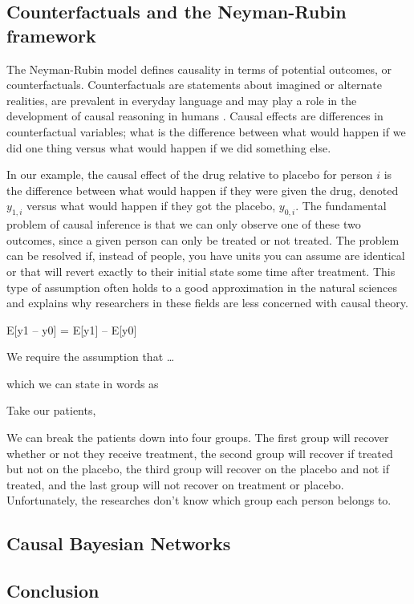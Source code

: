 \documentclass[11pt,a4paper]{article}
\begin{document}
\subsection{Counterfactuals and the Neyman-Rubin framework}

The Neyman-Rubin model \cite{Rubin1974,Rubin1978,Rosenbaum1983, Rubin2005,Rubin2008} defines causality in terms of potential outcomes, or counterfactuals. Counterfactuals are statements about imagined or alternate realities, are prevalent in everyday language and may play a role in the development of causal reasoning in humans \cite{Weisberg2013}. Causal effects are differences in counterfactual variables; what is the difference between what would happen if we did one thing versus what would happen if we did something else. 

In our example, the causal effect of the drug relative to placebo for person $i$ is the difference between what would happen if they were given the drug, denoted $y_{1,i}$ versus what would happen if they got the placebo, $y_{0,i}$. The fundamental problem of causal inference is that we can only observe one of these two outcomes, since a given person can only be treated or not treated. The problem can be resolved if, instead of people, you have units you can assume are identical or that will revert exactly to their initial state some time after treatment. This type of assumption often holds to a good approximation in the natural sciences and explains why researchers in these fields are less concerned with causal theory.  

E[y1 – y0] = E[y1] – E[y0]

We require the assumption that …

which we can state in words as


Take our patients, 

We can break the patients down into four groups. The first group will recover whether or not they receive treatment, the second group will recover if treated but not on the placebo, the third group will recover on the placebo and not if treated, and the last group will not recover on treatment or placebo. Unfortunately, the researches don't know which group each person belongs to. 

\subsection{Causal Bayesian Networks}

\subsection{Conclusion}
\end{document}
